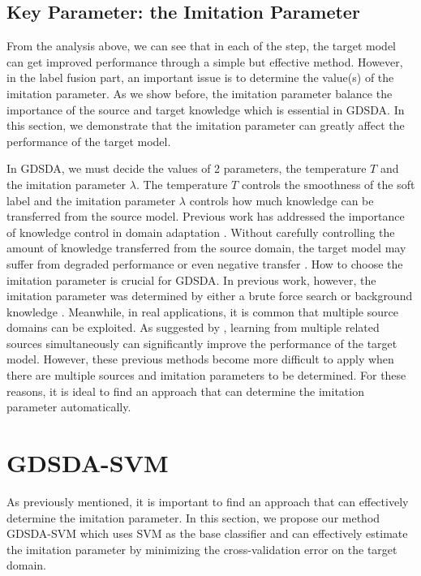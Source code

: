 \subsection{Key Parameter: the Imitation Parameter}\label{sec:aaai:key}
From the analysis above, we can see that in each of the step, the target model can get improved performance through a simple but effective method. However, in the label fusion part, an important issue is to determine the value(s) of the imitation parameter. As we show before, the imitation parameter balance the importance of the source and target knowledge which is essential in GDSDA. In this section, we demonstrate that the imitation parameter can greatly affect the performance of the target model.

In GDSDA, we must decide the values of 2 parameters, the temperature $T$ and the imitation parameter $\lambda$. The temperature $T$ controls the smoothness of the soft label and the imitation parameter $\lambda$ controls how much knowledge can be transferred from the source model. Previous work has addressed the importance of knowledge control in domain adaptation \cite{duan2012learning,duan2012visual}. Without carefully controlling the amount of knowledge transferred from the source domain, the target model may suffer from degraded performance or even negative transfer \cite{pan2010survey}.
How to choose the imitation parameter is crucial for GDSDA. In previous work, however, the imitation parameter was determined by either a brute force search \cite{lopez2015unifying} or background knowledge \cite{Tzeng_2015_ICCV}. Meanwhile, in real applications, it is common that  multiple source domains can be exploited. As suggested by \cite{tommasi2014learning}, learning from multiple related sources simultaneously can significantly improve the performance of the target model. However, these previous methods become more difficult to apply when there are multiple sources and imitation parameters to be determined.
For these reasons, it is ideal to find an approach that can determine the imitation parameter automatically.

\section{GDSDA-SVM}\label{sec:aaai:svm}
As previously mentioned, it is important to find an approach that can effectively determine the imitation parameter. In this section, we propose our method GDSDA-SVM which uses SVM as the base classifier and can effectively estimate the imitation parameter by minimizing the cross-validation error on the target domain.
